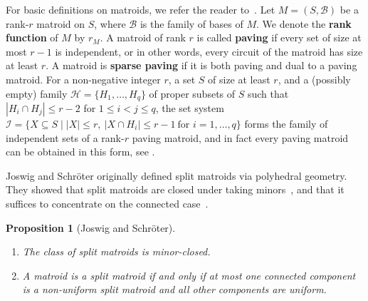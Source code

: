 \documentclass[11pt,a4paper]{article}
\theoremstyle{plain}
\newtheorem{prop}[thm]{Proposition}
\theoremstyle{definition}
\newcommand{\cB}{\mathcal{B}}
\begin{document}
For basic definitions on matroids, we refer the reader to~\cite{oxley2011matroid}. 
Let $M=(S,\cB)$ be a rank-$r$ matroid on $S$, where $\cB$ is the family of bases of $M$. We denote the \textbf{rank function} of $M$ by $r_M$. A matroid of rank $r$ is called \textbf{paving} if every set of size at most $r-1$ is independent, or in other words, every circuit of the matroid has size at least $r$. A matroid is \textbf{sparse paving} if it is both paving and dual to a paving matroid. For a non-negative integer $r$, a set $S$ of size at least $r$, and a (possibly empty) family $\mathcal{H}=\{H_1,\dots,H_q\}$ of proper subsets of $S$ such that $|H_i\cap H_j|\leq r-2$ for $1\leq i < j\leq q$, the set system $\mathcal{I}=\{X\subseteq S\mid |X|\leq r,\ |X\cap H_i|\leq r-1\ \text{for } i=1,\dots,q\}$ forms the family of independent sets of a rank-$r$ paving matroid, and in fact every paving matroid can be obtained in this form, see \cite{hartmanis1959lattice,welsh1976matroid}. 

Joswig and Schr\"oter originally defined split matroids via polyhedral geometry. They showed that split matroids are closed under taking minors~\cite[Proposition 44]{joswig2017matroids}, and that it suffices to concentrate on the connected case~\cite[Proposition 15]{joswig2017matroids}.

\begin{prop}[Joswig and Schr\"oter]\label{prop:conn}
\mbox{}

\begin{enumerate}[label={(\alph*)}] \itemsep0em
    \item The class of split matroids is minor-closed. \label{it:min}
    \item  A matroid is a split matroid if and only if at most one connected component is a non-uniform split matroid and all other components are uniform. \label{it:conn}
\end{enumerate}
\end{prop}
\end{document}
